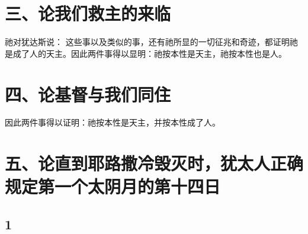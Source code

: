 
\section{三、论我们救主的来临}

祂对犹达斯说： 这些事以及类似的事，还有祂所显的一切征兆和奇迹，都证明祂是成了人的天主。因此两件事得以显明：祂按本性是天主，祂按本性也是人。\par


\section{四、论基督与我们同住}

因此两件事得以证明：祂按本性是天主，并按本性成了人。\par


\section{五、论直到耶路撒冷毁灭时，犹太人正确规定第一个太阴月的第十四日}


\subsection{1}

